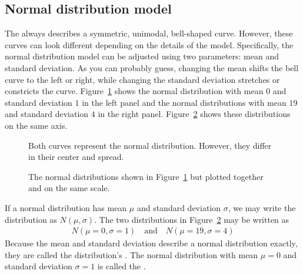 \subsection{Normal distribution model}

The  always describes a symmetric,
unimodal, bell-shaped curve.
However, these curves can look different depending on the
details of the model.
Specifically, the normal distribution model can be adjusted
using two parameters: mean and standard deviation.
As you can probably guess, changing the mean shifts the bell
curve to the left or right, while changing the standard deviation
stretches or constricts the curve.
Figure~\ref{twoSampleNormals} shows the normal distribution
with mean $0$ and standard deviation $1$ in the left panel
and the normal distributions with mean $19$ and standard
deviation $4$ in the right panel.
Figure~\ref{twoSampleNormalsStacked} shows these distributions
on the same axis.

\begin{figure}[h]
  \centering
  \caption{Both curves represent the normal distribution.
      However, they differ in their center and spread.}
  \label{twoSampleNormals}
\end{figure}

\begin{figure}[h]
  \centering
  \caption{The normal distributions shown in
      Figure~\ref{twoSampleNormals} but plotted together
      and on the same scale.}
  \label{twoSampleNormalsStacked}
\end{figure}

If a normal distribution has mean $\mu$ and standard deviation
$\sigma$, we may write the distribution as $N(\mu, \sigma)$.
The two distributions in Figure~\ref{twoSampleNormalsStacked}
may be written as
\begin{align*}
N(\mu=0,\sigma=1)
  \quad \text{and} \quad
  N(\mu=19,\sigma=4)
\end{align*}
Because the mean and standard deviation describe a normal
distribution exactly, they are called the distribution's
.
The normal distribution with mean $\mu = 0$ and
standard deviation $\sigma = 1$ is called the
%
.

